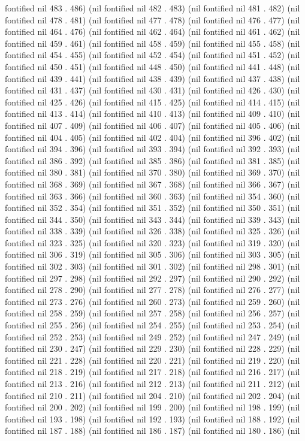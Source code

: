 fontified nil 483 . 486) (nil fontified nil 482 . 483) (nil fontified nil 481 . 482) (nil fontified nil 478 . 481) (nil fontified nil 477 . 478) (nil fontified nil 476 . 477) (nil fontified nil 464 . 476) (nil fontified nil 462 . 464) (nil fontified nil 461 . 462) (nil fontified nil 459 . 461) (nil fontified nil 458 . 459) (nil fontified nil 455 . 458) (nil fontified nil 454 . 455) (nil fontified nil 452 . 454) (nil fontified nil 451 . 452) (nil fontified nil 450 . 451) (nil fontified nil 448 . 450) (nil fontified nil 441 . 448) (nil fontified nil 439 . 441) (nil fontified nil 438 . 439) (nil fontified nil 437 . 438) (nil fontified nil 431 . 437) (nil fontified nil 430 . 431) (nil fontified nil 426 . 430) (nil fontified nil 425 . 426) (nil fontified nil 415 . 425) (nil fontified nil 414 . 415) (nil fontified nil 413 . 414) (nil fontified nil 410 . 413) (nil fontified nil 409 . 410) (nil fontified nil 407 . 409) (nil fontified nil 406 . 407) (nil fontified nil 405 . 406) (nil fontified nil 404 . 405) (nil fontified nil 402 . 404) (nil fontified nil 396 . 402) (nil fontified nil 394 . 396) (nil fontified nil 393 . 394) (nil fontified nil 392 . 393) (nil fontified nil 386 . 392) (nil fontified nil 385 . 386) (nil fontified nil 381 . 385) (nil fontified nil 380 . 381) (nil fontified nil 370 . 380) (nil fontified nil 369 . 370) (nil fontified nil 368 . 369) (nil fontified nil 367 . 368) (nil fontified nil 366 . 367) (nil fontified nil 363 . 366) (nil fontified nil 360 . 363) (nil fontified nil 354 . 360) (nil fontified nil 352 . 354) (nil fontified nil 351 . 352) (nil fontified nil 350 . 351) (nil fontified nil 344 . 350) (nil fontified nil 343 . 344) (nil fontified nil 339 . 343) (nil fontified nil 338 . 339) (nil fontified nil 326 . 338) (nil fontified nil 325 . 326) (nil fontified nil 323 . 325) (nil fontified nil 320 . 323) (nil fontified nil 319 . 320) (nil fontified nil 306 . 319) (nil fontified nil 305 . 306) (nil fontified nil 303 . 305) (nil fontified nil 302 . 303) (nil fontified nil 301 . 302) (nil fontified nil 298 . 301) (nil fontified nil 297 . 298) (nil fontified nil 292 . 297) (nil fontified nil 290 . 292) (nil fontified nil 278 . 290) (nil fontified nil 277 . 278) (nil fontified nil 276 . 277) (nil fontified nil 273 . 276) (nil fontified nil 260 . 273) (nil fontified nil 259 . 260) (nil fontified nil 258 . 259) (nil fontified nil 257 . 258) (nil fontified nil 256 . 257) (nil fontified nil 255 . 256) (nil fontified nil 254 . 255) (nil fontified nil 253 . 254) (nil fontified nil 252 . 253) (nil fontified nil 249 . 252) (nil fontified nil 247 . 249) (nil fontified nil 230 . 247) (nil fontified nil 229 . 230) (nil fontified nil 228 . 229) (nil fontified nil 221 . 228) (nil fontified nil 220 . 221) (nil fontified nil 219 . 220) (nil fontified nil 218 . 219) (nil fontified nil 217 . 218) (nil fontified nil 216 . 217) (nil fontified nil 213 . 216) (nil fontified nil 212 . 213) (nil fontified nil 211 . 212) (nil fontified nil 210 . 211) (nil fontified nil 204 . 210) (nil fontified nil 202 . 204) (nil fontified nil 200 . 202) (nil fontified nil 199 . 200) (nil fontified nil 198 . 199) (nil fontified nil 193 . 198) (nil fontified nil 192 . 193) (nil fontified nil 188 . 192) (nil fontified nil 187 . 188) (nil fontified nil 186 . 187) (nil fontified nil 180 . 186) (nil 